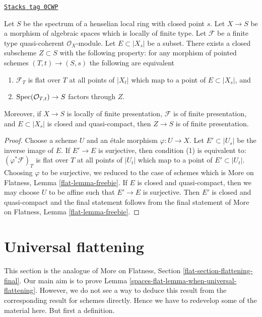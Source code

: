 \begin{lemma}[Freebie]
\label{spaces-flat-lemma-freebie}
\href{https://stacks.math.columbia.edu/tag/0CWP}{\texttt{Stacks tag 0CWP}}

Let $S$ be the spectrum of a henselian local ring with closed point $s$.
Let $X \to S$ be a morphism of algebraic spaces which is
locally of finite type.
Let $\mathcal{F}$ be a finite type quasi-coherent $\mathcal{O}_X$-module.
Let $E \subset |X_s|$ be a subset. There exists a closed subscheme
$Z \subset S$ with the following property: for any morphism of pointed
schemes $(T, t) \to (S, s)$ the following are equivalent
\begin{enumerate}
\item $\mathcal{F}_T$ is flat over $T$ at all points of
$|X_t|$ which map to a point of $E \subset |X_s|$, and
\item $\operatorname{Spec}(\mathcal{O}_{T, t}) \to S$ factors through $Z$.
\end{enumerate}
Moreover, if $X \to S$ is locally of finite presentation,
$\mathcal{F}$ is of finite presentation, and $E \subset |X_s|$ is
closed and quasi-compact, then $Z \to S$ is of finite presentation.
\end{lemma}

\begin{proof}
Choose a scheme $U$ and an \'etale morphism $\varphi : U \to X$.
Let $E' \subset |U_s|$ be the inverse image of $E$. If
$E' \to E$ is surjective, then condition (1) is equivalent to:
$(\varphi^*\mathcal{F})_T$ is flat over $T$ at all points of
$|U_t|$ which map to a point of $E' \subset |U_t|$.
Choosing $\varphi$ to be surjective, we reduced to the case of schemes which is
More on Flatness, Lemma \ref{flat-lemma-freebie}.
If $E$ is closed and quasi-compact, then we may choose $U$ to be
affine such that $E' \to E$ is surjective. Then $E'$ is closed
and quasi-compact and the final statement follows from the
final statement of
More on Flatness, Lemma \ref{flat-lemma-freebie}.
\end{proof}

\section{Universal flattening}
\label{spaces-flat-section-flattening-final}
This section is the analogue of
More on Flatness, Section \ref{flat-section-flattening-final}.
Our main aim is to prove
Lemma \ref{spaces-flat-lemma-when-universal-flattening}.
However, we do not see a way to deduce this result
from the corresponding result for schemes directly.
Hence we have to redevelop some of the material here.
But first a definition.


